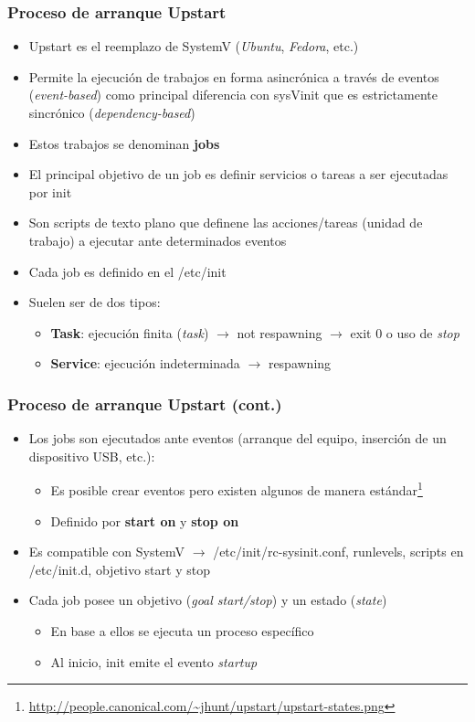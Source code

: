 \begin{frame}
  \frametitle{Proceso de arranque \textbf{Upstart}}
  \begin{itemize}
	  	\item Upstart es el reemplazo de SystemV (\emph{Ubuntu}, \emph{Fedora}, etc.)
	  	\item Permite la ejecución de trabajos en forma asincrónica a través de eventos (\textit{event-based}) como principal diferencia con sysVinit que es estrictamente sincrónico (\textit{dependency-based})
	  	\item Estos trabajos se denominan \textbf{jobs}
		\item El principal objetivo de un job es definir servicios o tareas a ser ejecutadas por init
		\item Son scripts de texto plano que definene las acciones/tareas (unidad de trabajo) a ejecutar ante determinados eventos		
	  	\item Cada job es definido en el /etc/init
	  	\item Suelen ser de dos tipos:
	  	\begin{itemize}
	  		\item \textbf{Task}: ejecución finita (\textit{task}) $\rightarrow$ not respawning $\rightarrow$ exit 0 o uso de \textit{stop}
	  		\item \textbf{Service}: ejecución indeterminada $\rightarrow$ respawning
	  	\end{itemize}	  	
  \end{itemize}
\end{frame}

\begin{frame}
  \frametitle{Proceso de arranque \textbf{Upstart} (cont.)}
  \begin{itemize}
	  	\item Los jobs son ejecutados ante eventos (arranque del equipo, inserción de un dispositivo USB, etc.):
	  	\begin{itemize}
	  		\item Es posible crear eventos pero existen algunos de manera estándar\footnote{\url{http://people.canonical.com/~jhunt/upstart/upstart-states.png}}
	  		\item Definido por \textbf{start on} y \textbf{stop on}
	  	\end{itemize}  
  		\item Es compatible con SystemV $\rightarrow$ /etc/init/rc-sysinit.conf, runlevels, scripts en /etc/init.d, objetivo start y stop
	  	\item Cada job posee un objetivo (\textit{goal start/stop}) y un estado (\textit{state})
	  	\begin{itemize}
	  		\item En base a ellos se ejecuta un proceso específico
	  		\item Al inicio, init emite el evento \textit{startup}
	  	\end{itemize}
  \end{itemize}
\end{frame}

